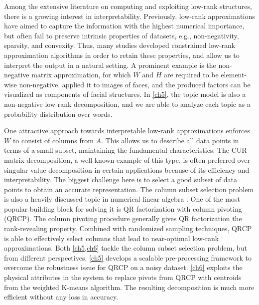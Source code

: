 Among the extensive literature on computing and exploiting low\hyp{}rank
structures, there is a growing interest in interpretability. Previously, 
low\hyp{}rank approximations have aimed to capture the information with the
highest numerical importance, but often fail to preserve intrinsic properties of
datasets, e.g., non\hyp{}negativity, sparsity, and convexity. Thus, many studies
developed constrained low\hyp{}rank approximation algorithms in order to retain
these properties, and allow us to interpret the output in a natural setting. A
prominent example is the non\hyp{}negative matrix approximation, for which $W$
and $H$ are required to be element\hyp{}wise non\hyp{}negative. 
\citet{lee1999learning} applied it to images of faces, and the produced factors
can be visualized as components of facial structures. In \cref{ch5}, the topic
model is also a non\hyp{}negative low\hyp{}rank decomposition, and we are able
to analyze each topic as a probability distribution over words.

One attractive approach towards interpretable low\hyp{}rank approximations
enforces $W$ to consist of columns from $A$. This allows us to describe all data
points in terms of a small subset, maintaining the fundamental characteristics.
The CUR matrix decomposition, a well\hyp{}known example of this type, is often
preferred over singular value decomposition in certain applications because of
its efficiency and interpretability. The biggest challenge here is to select a
good subset of data points to obtain an accurate representation. The column
subset selection problem is also a heavily discussed topic in numerical linear
algebra \cite{boutsidis2009improved,deshpande2010efficient}. One of the most
popular building block for solving it is QR factorization with column pivoting 
(QRCP). The column pivoting procedure generally gives QR factorization the 
rank\hyp{}revealing property. Combined with randomized sampling techniques, QRCP
is able to effectively select columns that lead to near\hyp{}optimal 
low\hyp{}rank approximations. Both \cref{ch5,ch6} tackle the column subset
selection problem, but from different perspectives. \cref{ch5} develops a
scalable pre\hyp{}processing framework to overcome the robustness issue for
QRCP on a noisy dataset. \cref{ch6} exploits the physical attributes in the
system to replace pivots from QRCP with centroids from the weighted K\hyp{}means
algorithm. The resulting decomposition is much more efficient without any loss
in accuracy.